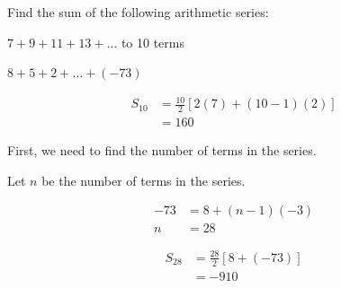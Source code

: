 \documentclass[11pt,a4paper]{book}
\begin{document}
\begin{example}

Find the sum of the following arithmetic series:

\begin{tasks}[label=(\alph*),label-width=3.5ex]

\task  $7+9+11+13+\ldots$ to 10 terms

\task  $8+5+2+\ldots+\left(-73\right)$

\end{tasks}

\Solution

\begin{tasks}[label=(\alph*),label-width=3.5ex]

\task
\begin{align*}
S_{10} & =\frac{10}{2}\left[2\left(7\right)+\left(10-1\right)\left(2\right)\right]\\
 & =160
\end{align*}

\task  First, we need to find the number of terms in the series.

Let $n$ be the number of terms in the series.

\begin{align*}
-73 & =8+\left(n-1\right)\left(-3\right)\\
n & =28
\end{align*}

\begin{align*}
S_{28} & =\frac{28}{2}\left[8+\left(-73\right)\right]\\
 & =-910
\end{align*}

\end{tasks}

\end{example}
\end{document}
